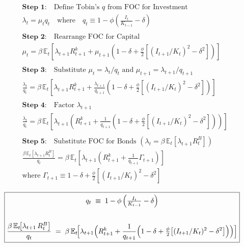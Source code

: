 \documentclass[11pt,preprint]{elsarticle}
\numberwithin{equation}{section}
\numberwithin{figure}{section}
\numberwithin{table}{section}
\begin{document}
\begin{align*}
& \textbf{Step 1:} \quad \text{Define Tobin's } q \text{ from FOC for Investment} \\
& \lambda_t = \mu_t q_t \quad \text{where} \quad q_t \equiv 1 - \phi\left(\tfrac{I_t}{K_{t-1}} - \delta\right) \\
& \\
& \textbf{Step 2:} \quad \text{Rearrange FOC for Capital} \\
& \mu_t = \beta\,\mathbb{E}_t\!\left[ \lambda_{t+1}R_{t+1}^k + \mu_{t+1}\!\left(1-\delta + \tfrac{\phi}{2}\left[(I_{t+1}/K_t)^2 - \delta^2\right]\right) \right] \\
& \\
& \textbf{Step 3:} \quad \text{Substitute } \mu_t = \lambda_t / q_t \text{ and } \mu_{t+1} = \lambda_{t+1} / q_{t+1} \\
& \frac{\lambda_t}{q_t} = \beta\,\mathbb{E}_t\!\left[ \lambda_{t+1}R_{t+1}^k + \frac{\lambda_{t+1}}{q_{t+1}}\left(1-\delta + \tfrac{\phi}{2}\left[(I_{t+1}/K_t)^2 - \delta^2\right]\right) \right] \\
& \\
& \textbf{Step 4:} \quad \text{Factor } \lambda_{t+1} \\
& \frac{\lambda_t}{q_t} = \beta\,\mathbb{E}_t\!\left[ \lambda_{t+1} \left( R_{t+1}^k + \frac{1}{q_{t+1}}\left(1-\delta + \tfrac{\phi}{2}\left[(I_{t+1}/K_t)^2 - \delta^2\right]\right) \right) \right] \\
& \\
& \textbf{Step 5:} \quad \text{Substitute FOC for Bonds } (\lambda_t = \beta\,\mathbb{E}_t[\lambda_{t+1}R_t^B]) \\
& \frac{\beta\,\mathbb{E}_t[\lambda_{t+1}R_t^B]}{q_t} = \beta\,\mathbb{E}_t\!\left[ \lambda_{t+1} \left( R_{t+1}^k + \frac{1}{q_{t+1}}\Gamma_{t+1} \right) \right] \\
& \text{where } \Gamma_{t+1} \equiv 1-\delta + \tfrac{\phi}{2}\left[(I_{t+1}/K_t)^2 - \delta^2\right]
\end{align*}

\begin{equation}\label{capital_euler_app}
\boxed{
  \begin{gathered}
  q_t \;\equiv\; 1 - \phi\,\Bigl(\tfrac{I_t}{K_{t-1}} - \delta\Bigr) \\
  \\
  \frac{\beta\,\mathbb{E}_t\!\bigl[\lambda_{t+1}\,R_t^B\bigr]}{q_t}
  \;=\;
  \beta\,\mathbb{E}_t\!\Bigl[
    \lambda_{t+1}\Bigl(
      R_{t+1}^k
      + \frac{1}{q_{t+1}}
        \Bigl(
          1 - \delta
          + \tfrac{\phi}{2}\bigl[(I_{t+1}/K_t)^2 - \delta^2\bigr]
        \Bigr)
    \Bigr)
  \Bigr]
  \end{gathered}
}
\end{equation}
\end{document}
